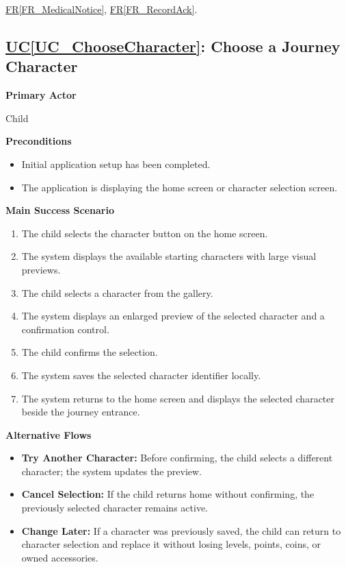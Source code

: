 \documentclass[12pt]{article}
\newcounter{ucnum} %
\newcommand{\ucref}[1]{\hyperref[#1]{UC\ref*{#1}}}
\newcommand{\rref}[1]{\hyperref[#1]{FR\ref*{#1}}}
\begin{document}
\rref{FR_MedicalNotice}, \rref{FR_RecordAck}.

\label{UC_ChooseCharacter}
\subsection{\ucref{UC_ChooseCharacter}: Choose a Journey Character}

\textbf{Primary Actor}

Child

\textbf{Preconditions}
\begin{itemize}
    \item Initial application setup has been completed.
    \item The application is displaying the home screen or character
    selection screen.
\end{itemize}

\textbf{Main Success Scenario}
\begin{enumerate}
    \item The child selects the character button on the home screen.
    \item The system displays the available starting characters with
    large visual previews.
    \item The child selects a character from the gallery.
    \item The system displays an enlarged preview of the selected
    character and a confirmation control.
    \item The child confirms the selection.
    \item The system saves the selected character identifier locally.
    \item The system returns to the home screen and displays the
    selected character beside the journey entrance.
\end{enumerate}

\textbf{Alternative Flows}
\begin{itemize}
    \item \textbf{Try Another Character:} Before confirming, the child
    selects a different character; the system updates the preview.
    \item \textbf{Cancel Selection:} If the child returns home without
    confirming, the previously selected character remains active.
    \item \textbf{Change Later:} If a character was previously saved,
    the child can return to character selection and replace it without
    losing levels, points, coins, or owned accessories.
\end{itemize}
\end{document}
